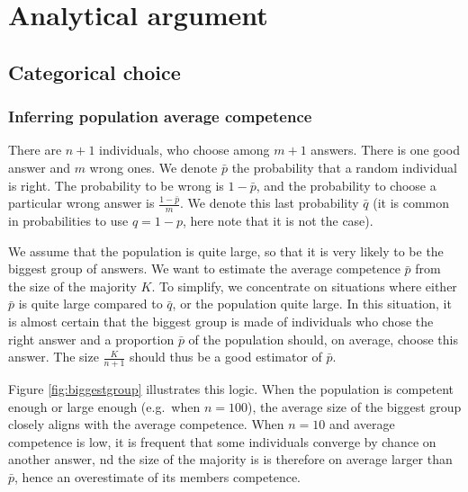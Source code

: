 \documentclass[
  doc,floatsintext]{apa6}
\begin{document}
\newpage

\appendix


\section{Analytical argument}\label{analytical}

\subsection{Categorical choice}\label{categorical-choice}

\subsubsection{Inferring population average competence}\label{inferring-population-average-competence}

There are \(n+1\) individuals, who choose among \(m+1\) answers. There is one good answer and \(m\) wrong ones. We denote \(\bar p\) the probability that a random individual is right. The probability to be wrong is \(1-\bar p\), and the probability to choose a particular wrong answer is \(\frac{1-\bar p}{m}\). We denote this last probability \(\bar q\) (it is common in probabilities to use \(q=1-p\), here note that it is not the case).

We assume that the population is quite large, so that it is very likely to be the biggest group of answers. We want to estimate the average competence \(\bar p\) from the size of the majority \(K\). To simplify, we concentrate on situations where either \(\bar p\) is quite large compared to \(\bar q\), or the population quite large. In this situation, it is almost certain that the biggest group is made of individuals who chose the right answer and a proportion \(\bar p\) of the population should, on average, choose this answer. The size \(\frac{K}{n+1}\) should thus be a good estimator of \(\bar p\).

Figure \ref{fig:biggestgroup} illustrates this logic. When the population is competent enough or large enough (e.g.~when \(n=100\)), the average size of the biggest group closely aligns with the average competence. When \(n=10\) and average competence is low, it is frequent that some individuals converge by chance on another answer, nd the size of the majority is is therefore on average larger than \(\bar p\), hence an overestimate of its members competence.
\end{document}
